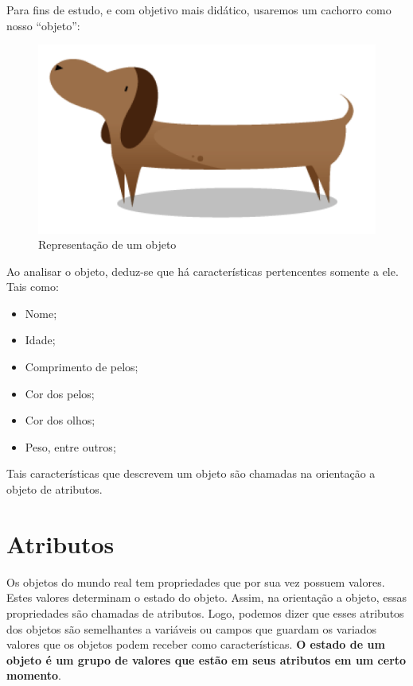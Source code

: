 Para fins de estudo, e com objetivo mais didático, usaremos um cachorro como 
nosso ``objeto'':

\begin{figure}[H]
  \centering
  \includegraphics[scale=0.4]{imagens/cachorro-objeto.png}
  \caption{Representação de um objeto}
  \label{fig:cachorro-objeto}
\end{figure}

Ao analisar o objeto, deduz-se que há características pertencentes somente a 
ele. Tais como:

\begin{itemize}
  \item Nome;
  \item Idade;
  \item Comprimento de pelos;
  \item Cor dos pelos;
  \item Cor dos olhos;
  \item Peso, entre outros;
\end{itemize}

Tais características que descrevem um objeto são chamadas na orientação a 
objeto de atributos.

\section{Atributos}

Os objetos do mundo real tem propriedades que por sua vez possuem valores. 
Estes valores determinam o estado do objeto. Assim, na orientação a objeto, 
essas propriedades são chamadas de atributos. Logo, podemos dizer que esses atributos dos objetos são semelhantes a variáveis ou campos que
guardam os variados valores que os objetos podem receber como características.
\textbf{O estado de um objeto é um grupo de valores que estão em seus atributos em um
certo momento}. \\


